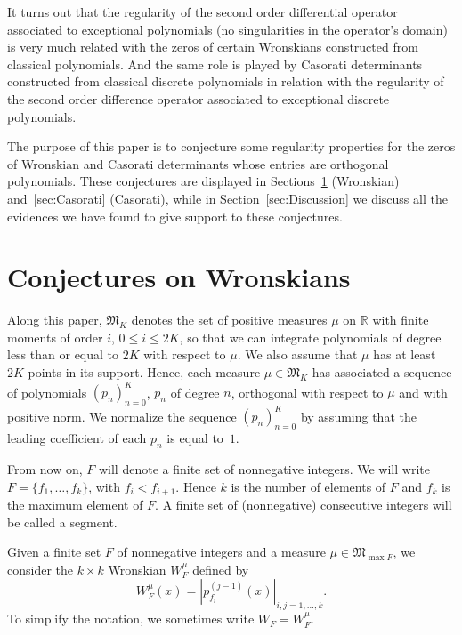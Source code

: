 \documentclass[10pt]{article}
\theoremstyle{plain}
\theoremstyle{definition}
\numberwithin{equation}{section} %
\newcommand\RR{\mathbb{R}}
\newcommand\M{\mathfrak{M}}
\begin{document}
It turns out that the regularity of the second order differential operator associated to exceptional polynomials (no singularities in the operator's domain) is very much related with the zeros of certain Wronskians constructed from  classical  polynomials. And the same role is played by Casorati determinants constructed from  classical discrete polynomials in relation with the regularity of the second order difference operator associated to exceptional discrete polynomials.

The purpose of this paper is to conjecture some regularity properties for the zeros of Wronskian and Casorati determinants whose entries are orthogonal polynomials. These conjectures are displayed in Sections~\ref{sec:Wronskians} (Wronskian) and~\ref{sec:Casorati} (Casorati), while in Section~\ref{sec:Discussion} we discuss all the evidences we have found to give support to these conjectures.

\section{Conjectures on Wronskians}
\label{sec:Wronskians}

Along this paper, $\M _K$ denotes the set of positive measures $\mu$ on $\RR$
with finite moments of order $i$, $0\le i\le 2K$, so that we can
integrate polynomials of degree less than or equal to $2K$ with
respect to $\mu$. We also assume that $\mu$ has at least $2K$
points in its support. Hence, each measure $\mu \in \M_K$ has
associated a sequence of polynomials $(p_n)_{n=0}^K$, $p_n$
of degree $n$, orthogonal with respect to $\mu$ and with positive norm. We normalize the
sequence $(p_n)_{n=0}^K$ by assuming that the leading coefficient
of each $p_n$ is equal to~$1$.

From now on, $F$ will denote a finite set of nonnegative integers.
We will write $F=\{ f_1,\dots, f_k\}$, with $f_i<f_{i+1}$.
Hence $k$ is the number of elements of $F$ and $f_k$ is the maximum element of $F$.
A finite set of (nonnegative) consecutive integers will be called a segment.

Given a finite set $F$ of nonnegative integers and a measure $\mu\in \M _{\max F}$, we consider the $k\times k$ Wronskian $W_F^\mu$ defined by
\begin{equation}\label{defwrons}
   W_F^\mu (x)=|p_{f_i}^{(j-1)}(x)|_{i,j=1,\dots, k}.
\end{equation}
To simplify the notation, we sometimes write $W_F=W_F^\mu$.
\end{document}
